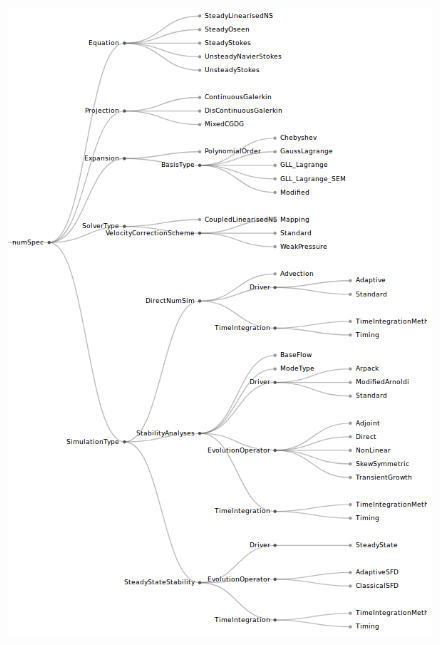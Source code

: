\documentclass[11pt, a4paper]{report}
\begin{document}
\begin{figure}[htb!]
 \centering
 \includegraphics[width=1\linewidth,  clip=true, trim = 0cm 0cm 0cm 0cm]{numericalSpecification}
 \label{fig:numericalSpecification}
\end{figure}
\end{document}
